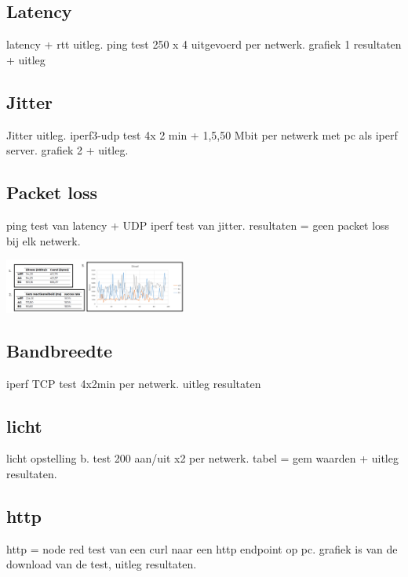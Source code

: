 \documentclass[a0,portrait]{hogent-poster}
\begin{document}
\begin{multicols}{2}
\begin{multicols}{2}
\subsection*{Latency}
latency + rtt uitleg. ping test 250 x 4 uitgevoerd per netwerk. grafiek 1 resultaten + uitleg
\subsection*{Jitter}
Jitter uitleg. iperf3-udp test 4x 2 min + 1,5,50 Mbit per netwerk met pc als iperf server. grafiek 2 + uitleg.
\end{multicols}
\subsection*{Packet loss}
ping test van latency + UDP iperf test van jitter. resultaten = geen packet loss bij elk netwerk.

\begin{center}
    \captionsetup{type=figure}
    \includegraphics[width=0.45\textwidth]{../graphics/bandbreedteLichtHttp.png}
\end{center}

\begin{multicols}{2}
\subsection*{Bandbreedte}
iperf TCP test 4x2min per netwerk. uitleg resultaten

\subsection*{licht}
licht opstelling b. test 200 aan/uit x2 per netwerk. tabel = gem waarden + uitleg resultaten. 
\end{multicols}

\subsection*{http}
http = node red test van een curl naar een http endpoint op pc. grafiek is van de download van de test, uitleg resultaten.

\end{multicols}
\end{document}
